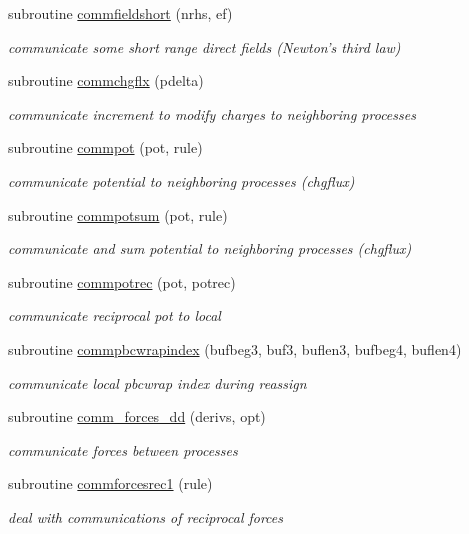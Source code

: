 \begin{DoxyCompactItemize}
subroutine \hyperlink{mpistuff_8f90_a169604d25f0a9f409a1640817b9c8869}{commfieldshort} (nrhs, ef)
\begin{DoxyCompactList}\small\item\em communicate some short range direct fields (Newton's third law) \end{DoxyCompactList}\item 
subroutine \hyperlink{mpistuff_8f90_af654cd86aea515c8f2fa049d35add490}{commchgflx} (pdelta)
\begin{DoxyCompactList}\small\item\em communicate increment to modify charges to neighboring processes \end{DoxyCompactList}\item 
subroutine \hyperlink{mpistuff_8f90_a577359ca425dbc13ed910a17d1f26618}{commpot} (pot, rule)
\begin{DoxyCompactList}\small\item\em communicate potential to neighboring processes (chgflux) \end{DoxyCompactList}\item 
subroutine \hyperlink{mpistuff_8f90_aae5ab8cb5f11581ff41f4e791bef0ec7}{commpotsum} (pot, rule)
\begin{DoxyCompactList}\small\item\em communicate and sum potential to neighboring processes (chgflux) \end{DoxyCompactList}\item 
subroutine \hyperlink{mpistuff_8f90_a0fd1f56f03b8f3e81283d77bc46559ef}{commpotrec} (pot, potrec)
\begin{DoxyCompactList}\small\item\em communicate reciprocal pot to local \end{DoxyCompactList}\item 
subroutine \hyperlink{mpistuff_8f90_a1641f128629251cd7963d8d2ff9d2e9c}{commpbcwrapindex} (bufbeg3, buf3, buflen3, bufbeg4, buflen4)
\begin{DoxyCompactList}\small\item\em communicate local pbcwrap index during reassign \end{DoxyCompactList}\item 
subroutine \hyperlink{mpistuff_8f90_aeaeb5e1951bf006ddd815662f6b576a5}{comm\-\_\-forces\-\_\-dd} (derivs, opt)
\begin{DoxyCompactList}\small\item\em communicate forces between processes \end{DoxyCompactList}\item 
subroutine \hyperlink{mpistuff_8f90_ae72f8c9ae955d67b1057c4f240edcfce}{commforcesrec1} (rule)
\begin{DoxyCompactList}\small\item\em deal with communications of reciprocal forces \end{DoxyCompactList}\end{DoxyCompactItemize}


